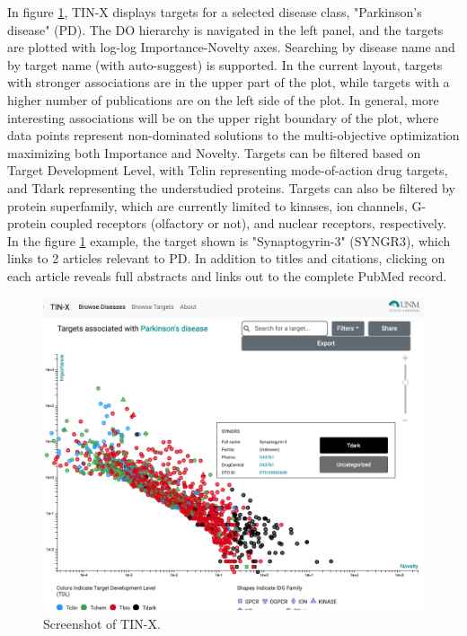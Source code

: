 In figure \ref{fig:tinx_01}, TIN-X displays targets for a selected disease class, "Parkinson's disease" (PD).  The DO hierarchy is navigated in the left panel, and the targets are plotted with log-log Importance-Novelty axes. Searching by disease name and by target name (with auto-suggest) is supported. In the current layout, targets with stronger associations are in the upper part of the plot, while targets with a higher number of publications are on the left side of the plot. In general, more interesting associations will be on the upper right boundary of the plot, where data points represent non-dominated solutions to the multi-objective optimization maximizing both Importance and Novelty.  Targets can be filtered based on Target Development Level, with Tclin representing mode-of-action drug targets\cite{Santos2017-sd}, and Tdark representing the understudied proteins\cite{Nguyen2017-lo}. Targets can also be filtered by protein superfamily, which are currently limited to kinases, ion channels, G-protein coupled receptors (olfactory or not), and nuclear receptors, respectively. In the figure \ref{fig:tinx_01} example, the target shown is "Synaptogyrin-3" (SYNGR3), which links to 2 articles relevant to PD.  In addition to titles and citations, clicking on each article reveals full abstracts and links out to the complete PubMed record. 

\begin{figure}
    \centering
    \includegraphics[width=\linewidth]{figures/tinx/TINX_SYNRG3_rev3.png}
    \caption{Screenshot of TIN-X.}
    \label{fig:tinx_01}
\end{figure}

